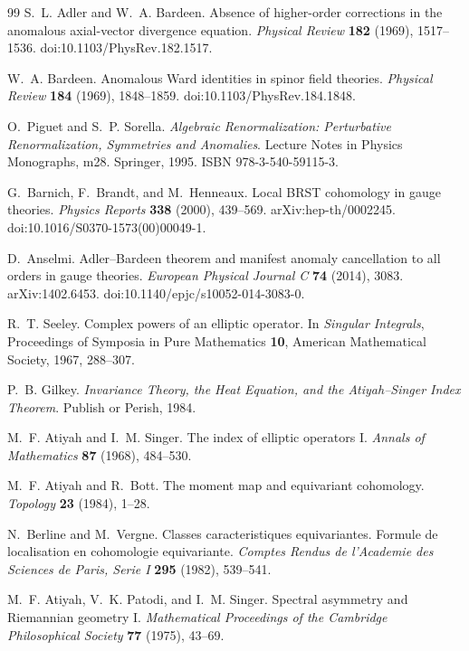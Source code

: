 \begin{thebibliography}{99}
S.~L. Adler and W.~A. Bardeen.
Absence of higher-order corrections in the anomalous axial-vector divergence
equation.
\emph{Physical Review} \textbf{182} (1969), 1517--1536.
doi:10.1103/PhysRev.182.1517.

W.~A. Bardeen.
Anomalous Ward identities in spinor field theories.
\emph{Physical Review} \textbf{184} (1969), 1848--1859.
doi:10.1103/PhysRev.184.1848.

O.~Piguet and S.~P. Sorella.
\emph{Algebraic Renormalization: Perturbative Renormalization, Symmetries and
Anomalies}.
Lecture Notes in Physics Monographs, m28.
Springer, 1995.
ISBN 978-3-540-59115-3.

G.~Barnich, F.~Brandt, and M.~Henneaux.
Local BRST cohomology in gauge theories.
\emph{Physics Reports} \textbf{338} (2000), 439--569.
arXiv:hep-th/0002245.
doi:10.1016/S0370-1573(00)00049-1.

D.~Anselmi.
Adler--Bardeen theorem and manifest anomaly cancellation to all orders in
gauge theories.
\emph{European Physical Journal C} \textbf{74} (2014), 3083.
arXiv:1402.6453.
doi:10.1140/epjc/s10052-014-3083-0.

R.~T. Seeley.
Complex powers of an elliptic operator.
In \emph{Singular Integrals}, Proceedings of Symposia in Pure Mathematics
\textbf{10}, American Mathematical Society, 1967, 288--307.

P.~B. Gilkey.
\emph{Invariance Theory, the Heat Equation, and the Atiyah--Singer Index
Theorem}.
Publish or Perish, 1984.

M.~F. Atiyah and I.~M. Singer.
The index of elliptic operators I.
\emph{Annals of Mathematics} \textbf{87} (1968), 484--530.

M.~F. Atiyah and R.~Bott.
The moment map and equivariant cohomology.
\emph{Topology} \textbf{23} (1984), 1--28.

N.~Berline and M.~Vergne.
Classes caracteristiques equivariantes. Formule de localisation en
cohomologie equivariante.
\emph{Comptes Rendus de l'Academie des Sciences de Paris, Serie I}
\textbf{295} (1982), 539--541.

M.~F. Atiyah, V.~K. Patodi, and I.~M. Singer.
Spectral asymmetry and Riemannian geometry I.
\emph{Mathematical Proceedings of the Cambridge Philosophical Society}
\textbf{77} (1975), 43--69.


\end{thebibliography}
